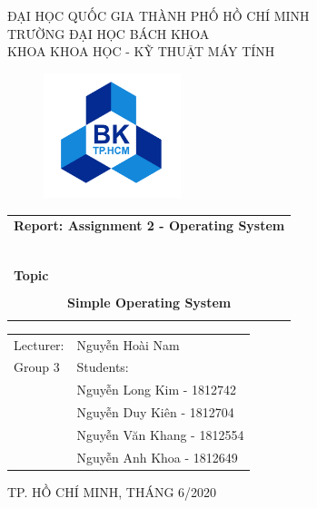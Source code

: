 \begin{titlepage} %
\begin{center}
ĐẠI HỌC QUỐC GIA THÀNH PHỐ HỒ CHÍ MINH \\
TRƯỜNG ĐẠI HỌC BÁCH KHOA \\
KHOA KHOA HỌC - KỸ THUẬT MÁY TÍNH 
\end{center}
\vspace{1cm}
\begin{figure}[h!]
\begin{center}
\includegraphics[width=4cm]{images/LogoBK.png}
\end{center}
\end{figure}
\vspace{1cm}
\begin{center}
\begin{tabular}{c}
\multicolumn{1}{c}{\textbf{{\Large Report: Assignment 2 - Operating System }}}\\
~~\\

\hline
\\
\multicolumn{1}{l}{\textbf{{\Large Topic}}}\\
\\
\textbf{{\Huge Simple Operating System}}\\
\\
\hline
\end{tabular}
\end{center}
\vspace{0.5cm}
\vspace{0.5cm}
\begin{table}[h]
\hspace{5cm} 
\begin{tabular}{ll}
    Lecturer: & Nguyễn Hoài Nam\\
    Group 3 & Students:\\
   		& Nguyễn Long Kim - 1812742 \\
		& Nguyễn Duy Kiên - 1812704 \\
		& Nguyễn Văn Khang - 1812554 \\
		& Nguyễn Anh Khoa - 1812649 \\
\end{tabular}
\end{table}
\vspace{5cm}
\begin{center}
{\footnotesize TP. HỒ CHÍ MINH, THÁNG 6/2020}
\end{center}
\end{titlepage} %